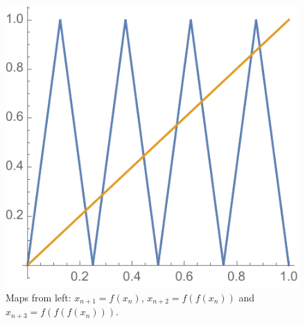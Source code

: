 \documentclass[12pt,letterpaper,noanswers]{exam}
\begin{document}
\begin{enumerate}
\begin{enumerate}
\begin{figure}[h]
\includegraphics[scale=0.5]{img/C20map3.pdf}
\caption{Maps from left: $x_{n+1} = f(x_n)$, $x_{n+2} = f(f(x_n))$ and $x_{n+3} = f(f(f(x_n)))$.}
\end{figure}

\end{enumerate}
\end{enumerate}
\end{document}
